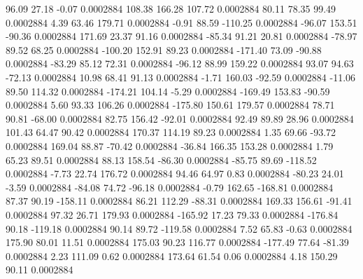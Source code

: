        96.09       27.18       -0.07     0.0002884
      108.38      166.28      107.72     0.0002884
       80.11       78.35       99.49     0.0002884
        4.39       63.46      179.71     0.0002884
       -0.91       88.59     -110.25     0.0002884
      -96.07      153.51      -90.36     0.0002884
      171.69       23.37       91.16     0.0002884
      -85.34       91.21       20.81     0.0002884
      -78.97       89.52       68.25     0.0002884
     -100.20      152.91       89.23     0.0002884
     -171.40       73.09      -90.88     0.0002884
      -83.29       85.12       72.31     0.0002884
      -96.12       88.99      159.22     0.0002884
       93.07       94.63      -72.13     0.0002884
       10.98       68.41       91.13     0.0002884
       -1.71      160.03      -92.59     0.0002884
      -11.06       89.50      114.32     0.0002884
     -174.21      104.14       -5.29     0.0002884
     -169.49      153.83      -90.59     0.0002884
        5.60       93.33      106.26     0.0002884
     -175.80      150.61      179.57     0.0002884
       78.71       90.81      -68.00     0.0002884
       82.75      156.42      -92.01     0.0002884
       92.49       89.89       28.96     0.0002884
      101.43       64.47       90.42     0.0002884
      170.37      114.19       89.23     0.0002884
        1.35       69.66      -93.72     0.0002884
      169.04       88.87      -70.42     0.0002884
      -36.84      166.35      153.28     0.0002884
        1.79       65.23       89.51     0.0002884
       88.13      158.54      -86.30     0.0002884
      -85.75       89.69     -118.52     0.0002884
       -7.73       22.74      176.72     0.0002884
       94.46       64.97        0.83     0.0002884
      -80.23       24.01       -3.59     0.0002884
      -84.08       74.72      -96.18     0.0002884
       -0.79      162.65     -168.81     0.0002884
       87.37       90.19     -158.11     0.0002884
       86.21      112.29      -88.31     0.0002884
      169.33      156.61      -91.41     0.0002884
       97.32       26.71      179.93     0.0002884
     -165.92       17.23       79.33     0.0002884
     -176.84       90.18     -119.18     0.0002884
       90.14       89.72     -119.58     0.0002884
        7.52       65.83       -0.63     0.0002884
      175.90       80.01       11.51     0.0002884
      175.03       90.23      116.77     0.0002884
     -177.49       77.64      -81.39     0.0002884
        2.23      111.09        0.62     0.0002884
      173.64       61.54        0.06     0.0002884
        4.18      150.29       90.11     0.0002884
